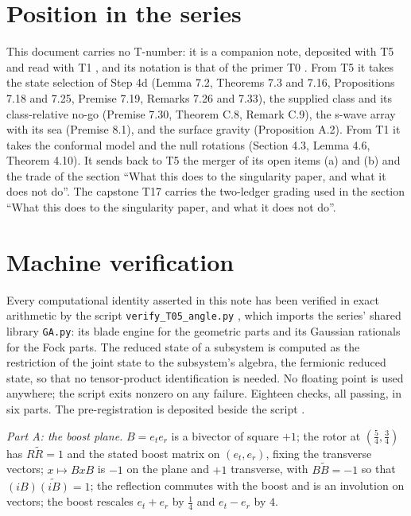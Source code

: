 \documentclass[11pt]{article}
\theoremstyle{definition}
\theoremstyle{plain}
\begin{document}
\section{Position in the series}

\label{c:note.angle.setting-position-series}
This document carries no T-number: it is a companion note, deposited with T5 \cite{ButlerT5} and read with T1 \cite{ButlerT1}, and its notation is that of the primer T0 \cite{ButlerT0}. From T5 it takes the state selection of Step 4d (Lemma 7.2, Theorems 7.3 and 7.16, Propositions 7.18 and 7.25, Premise 7.19, Remarks 7.26 and 7.33), the supplied class and its class-relative no-go (Premise 7.30, Theorem C.8, Remark C.9), the s-wave array with its sea (Premise 8.1), and the surface gravity (Proposition A.2). From T1 it takes the conformal model and the null rotations (Section 4.3, Lemma 4.6, Theorem 4.10). It sends back to T5 the merger of its open items (a) and (b) and the trade of the section ``What this does to the singularity paper, and what it does not do''. The capstone T17 \cite{ButlerT17} carries the two-ledger grading used in the section ``What this does to the singularity paper, and what it does not do''.

\section{Machine verification}

\label{c:note.angle.setting-machine-verification}
Every computational identity asserted in this note has been verified in exact arithmetic by the script \texttt{verify\_T05\_angle.py} \cite{ButlerVerifyT05angle}, which imports the series' shared library \texttt{GA.py}: its blade engine for the geometric parts and its Gaussian rationals for the Fock parts. The reduced state of a subsystem is computed as the restriction of the joint state to the subsystem's algebra, the fermionic reduced state, so that no tensor-product identification is needed. No floating point is used anywhere; the script exits nonzero on any failure. Eighteen checks, all passing, in six parts. The pre-registration is deposited beside the script \cite{ButlerPreregT05angle}.

\emph{Part A: the boost plane.} $B = e_{t}e_{r}$ is a bivector of square $+1$; the rotor at $(\tfrac54, \tfrac34)$ has $R\widetilde{R} = 1$ and the stated boost matrix on $(e_{t}, e_{r})$, fixing the transverse vectors; $x \mapsto BxB$ is $-1$ on the plane and $+1$ transverse, with $B\widetilde{B} = -1$ so that $(iB)\widetilde{(iB)} = 1$; the reflection commutes with the boost and is an involution on vectors; the boost rescales $e_{t} + e_{r}$ by $\tfrac14$ and $e_{t} - e_{r}$ by $4$.
\end{document}
